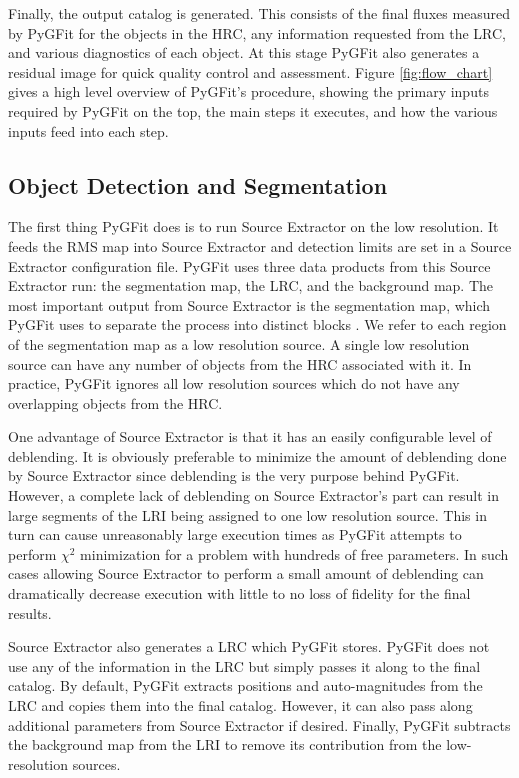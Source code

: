 \documentclass[preprint]{aastex}
\newcommand{\pygfit}{PyGFit}
\newcommand{\extractor}{Source Extractor}
\begin{document}
Finally, the output catalog is generated.  This consists of the final fluxes measured by \pygfit{} for the objects in the HRC, any information requested from the LRC, and various diagnostics of each object.  At this stage \pygfit{} also generates a residual image for quick quality control and assessment.  Figure \ref{fig:flow_chart} gives a high level overview of \pygfit{}'s procedure, showing the primary inputs required by \pygfit{} on the top, the main steps it executes, and how the various inputs feed into each step.

\subsection{Object Detection and Segmentation}\label{sec:segmentation}

The first thing \pygfit{} does is to run \extractor{} on the low resolution.  It feeds the RMS map into \extractor{} and detection limits are set in a \extractor{} configuration file.  \pygfit{} uses three data products from this \extractor{} run: the segmentation map, the LRC, and the background map.  The most important output from \extractor{} is the segmentation map, which \pygfit{} uses to separate the process into distinct blocks .  We refer to each region of the segmentation map as a low resolution source.  A single low resolution source can have any number of objects from the HRC associated with it.  In practice, \pygfit{} ignores all low resolution sources which do not have any overlapping objects from the HRC.

One advantage of \extractor{} is that it has an easily configurable level of deblending.  It is obviously preferable to minimize the amount of deblending done by \extractor{} since deblending is the very purpose behind \pygfit{}.  However, a complete lack of deblending on \extractor{}'s part can result in large segments of the LRI being assigned to one low resolution source.  This in turn can cause unreasonably large execution times as \pygfit{} attempts to perform $\chi^2$ minimization for a problem with hundreds of free parameters.  In such cases allowing \extractor{} to perform a small amount of deblending can dramatically decrease execution with little to no loss of fidelity for the final results.

\extractor{} also generates a LRC which \pygfit{} stores.  \pygfit{} does not use any of the information in the LRC but simply passes it along to the final catalog.  By default, \pygfit{} extracts positions and auto-magnitudes from the LRC and copies them into the final catalog.  However, it can also pass along additional parameters from \extractor{} if desired.
Finally, \pygfit{} subtracts the background map from the LRI to remove its contribution from the low-resolution sources.
\end{document}
